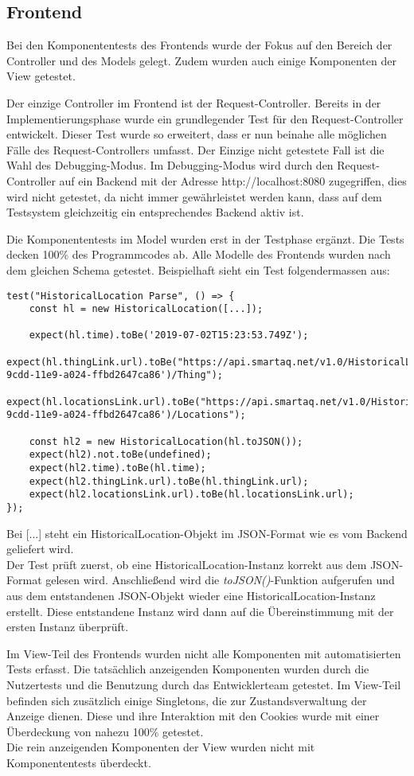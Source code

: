 \subsection{Frontend}
Bei den Komponententests des Frontends wurde der Fokus auf den Bereich der Controller und des Models gelegt.
Zudem wurden auch einige Komponenten der View getestet.

Der einzige Controller im Frontend ist der Request-Controller.
Bereits in der Implementierungsphase wurde ein grundlegender Test für den Request-Controller entwickelt.
Dieser Test wurde so erweitert, dass er nun beinahe alle möglichen Fälle des Request-Controllers umfasst.
Der Einzige nicht getestete Fall ist die Wahl des Debugging-Modus.
Im Debugging-Modus wird durch den Request-Controller auf ein Backend mit der Adresse http://localhost:8080 zugegriffen, dies wird nicht getestet, da nicht immer gewährleistet werden kann, dass auf dem Testsystem gleichzeitig ein entsprechendes Backend aktiv ist.

Die Komponententests im Model wurden erst in der Testphase ergänzt.
Die Tests decken 100\% des Programmcodes ab.
Alle Modelle des Frontends wurden nach dem gleichen Schema getestet.
Beispielhaft sieht ein Test folgendermassen aus:
\begin{lstlisting}[style=customjs]
test("HistoricalLocation Parse", () => {
    const hl = new HistoricalLocation([...]);

    expect(hl.time).toBe('2019-07-02T15:23:53.749Z');
    expect(hl.thingLink.url).toBe("https://api.smartaq.net/v1.0/HistoricalLocations('66c68826-9cdd-11e9-a024-ffbd2647ca86')/Thing");
    expect(hl.locationsLink.url).toBe("https://api.smartaq.net/v1.0/HistoricalLocations('66c68826-9cdd-11e9-a024-ffbd2647ca86')/Locations");

    const hl2 = new HistoricalLocation(hl.toJSON());
    expect(hl2).not.toBe(undefined);
    expect(hl2.time).toBe(hl.time);
    expect(hl2.thingLink.url).toBe(hl.thingLink.url);
    expect(hl2.locationsLink.url).toBe(hl.locationsLink.url);
});
\end{lstlisting}
Bei [...] steht ein HistoricalLocation-Objekt im \gls{JSON}-Format wie es vom Backend geliefert wird.
\\
Der Test prüft zuerst, ob eine HistoricalLocation-Instanz korrekt aus dem \gls{JSON}-Format gelesen wird.
Anschließend wird die \textit{toJSON()}-Funktion aufgerufen und aus dem entstandenen JSON-Objekt wieder eine HistoricalLocation-Instanz erstellt.
Diese entstandene Instanz wird dann auf die Übereinstimmung mit der ersten Instanz überprüft.

Im View-Teil des Frontends wurden nicht alle Komponenten mit automatisierten Tests erfasst.
Die tatsächlich anzeigenden Komponenten wurden durch die Nutzertests und die Benutzung durch das Entwicklerteam getestet.
Im View-Teil befinden sich zusätzlich einige Singletons, die zur Zustandsverwaltung der Anzeige dienen.
Diese und ihre Interaktion mit den Cookies wurde mit einer Überdeckung von nahezu 100\% getestet.
\\
Die rein anzeigenden Komponenten der View wurden nicht mit Komponententests überdeckt. 
